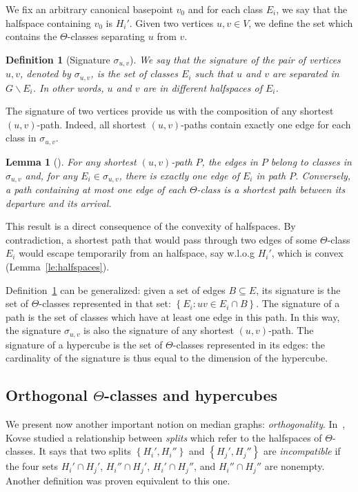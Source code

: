 \documentclass{article}
\newtheorem{definition}{Definition}
\newtheorem{lemma}{Lemma}
\newcommand{\set}[1]{\left\{ #1 \right\}}
\begin{document}
We fix an arbitrary canonical basepoint $v_0$ and for each class $E_i$, we say that the halfspace containing $v_0$ is $H_i'$.
Given two vertices $u,v \in V$, we define the set which contains the $\Theta$-classes separating $u$ from $v$.

\begin{definition}[Signature $\sigma_{u,v}$]
We say that the {\em signature} of the pair of vertices $u,v$, denoted by $\sigma_{u,v}$, is the set of classes $E_i$ such that $u$ and $v$ are separated in $G\backslash E_i$. In other words, $u$ and $v$ are in different halfspaces of $E_i$.
\label{def:signature}
\end{definition}

The signature of two vertices provide us with the composition of any shortest $(u,v)$-path. Indeed, all shortest $(u,v)$-paths contain exactly one edge for each class in $\sigma_{u,v}$.

\begin{lemma}[\cite{BeHa21}]
For any shortest $(u,v)$-path $P$, the edges in $P$ belong to classes in $\sigma_{u,v}$ and, for any $E_i \in \sigma_{u,v}$, there is exactly one edge of $E_i$ in path $P$. Conversely, a path containing at most one edge of each $\Theta$-class is a shortest path between its departure and its arrival.
\label{le:signature}
\end{lemma}

This result is a direct consequence of the convexity of halfspaces. By contradiction, a shortest path that would pass through two edges of some $\Theta$-class $E_i$ would escape temporarily from an halfspace, say w.l.o.g $H_i'$,  which is convex (Lemma~\ref{le:halfspaces}).

Definition~\ref{def:signature} can be generalized: given a set of edges $B\subseteq E$, its signature is the set of $\Theta$-classes represented in that set: $\set{E_i : uv \in E_i \cap B}$. The signature of a path is the set of classes which have at least one edge in this path. In this way, the signature $\sigma_{u,v}$ is also the signature of any shortest $(u,v)$-path. The signature of a hypercube is the set of $\Theta$-classes represented in its edges: the cardinality of the signature is thus equal to the dimension of the hypercube.

\subsection{Orthogonal $\Theta$-classes and hypercubes}

We present now another important notion on median graphs: \textit{orthogonality}. In~\cite{Ko09}, Kovse studied a relationship between \textit{splits} which refer to the halfspaces of $\Theta$-classes. It says that two splits $\set{H_i',H_i''}$ and $\set{H_j',H_j''}$ are \textit{incompatible} if the four sets $H_i' \cap H_j'$, $H_i'' \cap H_j'$, $H_i' \cap H_j''$, and $H_i'' \cap H_j''$ are nonempty. Another definition was proven equivalent to this one.
\end{document}
